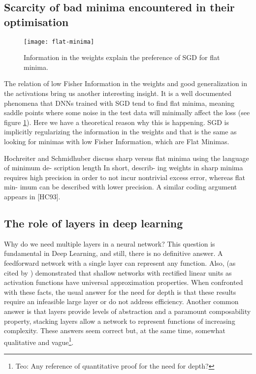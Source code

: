 \subsection{Scarcity of bad minima encountered in their optimisation}
\begin{figure}[h]
  \texttt{[image: flat-minima]}
  \caption{Information in the weights explain the preference of SGD for flat minima.}
  \label{fig:flat_minima}
\end{figure}
The relation of low Fisher Information in the weights and good generalization in the activations bring us another interesting insight. It is a well documented phenomena that DNNs trained with SGD tend to find flat minima, meaning saddle points where some noise in the test data will minimally affect the loss (see figure \ref{fig:flat_minima}).  Here we have a theoretical reason why this is happening. SGD is implicitly regularizing the information in the weights and that is the same as looking for minimas with low Fisher Information, which are Flat Minimas.

Hochreiter and Schmidhuber discuss sharp versus flat minima using the language of minimum de- scription length In short, describ- ing weights in sharp minima requires high precision in order to not incur nontrivial excess error, whereas flat min- imum can be described with lower precision. A similar coding argument appears in [HC93].

\subsection{The role of layers in deep learning}
Why do we need multiple layers in a neural network? This question is fundamental in Deep Learning, and still, there is no definitive answer. A feedforward network with a single layer can represent any function\cite{goodfellow:2016}. Also, \cite{leshno:1993} (as cited by \cite{goodfellow:2016}) demonstrated that shallow networks with rectified linear units as activation functions have universal approximation properties. When confronted with these facts, the usual answer for the need for depth is that these results require an infeasible large layer or do not address efficiency. Another common answer is that layers provide levels of abstraction and a paramount composability property, \ie stacking layers allow a network to represent functions of increasing complexity\cite{goodfellow}. These answers seem correct but, at the same time, somewhat qualitative and vague\footnote{Teo: Any reference of quantitative proof for the need for depth?}.

